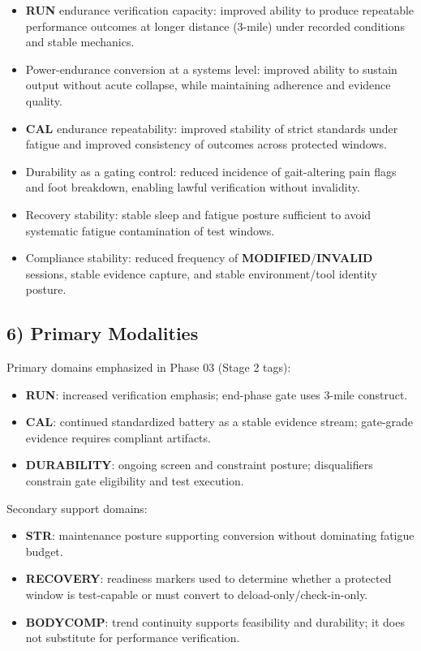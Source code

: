 \documentclass[10pt]{article}
\begin{document}
\begin{itemize}
\item \textbf{RUN} endurance verification capacity: improved ability to produce repeatable performance outcomes at longer distance (3-mile) under recorded conditions and stable mechanics.
\item Power-endurance conversion at a systems level: improved ability to sustain output without acute collapse, while maintaining adherence and evidence quality.
\item \textbf{CAL} endurance repeatability: improved stability of strict standards under fatigue and improved consistency of outcomes across protected windows.
\item Durability as a gating control: reduced incidence of gait-altering pain flags and foot breakdown, enabling lawful verification without invalidity.
\item Recovery stability: stable sleep and fatigue posture sufficient to avoid systematic fatigue contamination of test windows.
\item Compliance stability: reduced frequency of \textbf{MODIFIED}/\textbf{INVALID} sessions, stable evidence capture, and stable environment/tool identity posture.
\end{itemize}

\subsection*{6) Primary Modalities}

Primary domains emphasized in Phase 03 (Stage 2 tags):

\begin{itemize}
\item \textbf{RUN}: increased verification emphasis; end-phase gate uses 3-mile construct.
\item \textbf{CAL}: continued standardized battery as a stable evidence stream; gate-grade evidence requires compliant artifacts.
\item \textbf{DURABILITY}: ongoing screen and constraint posture; disqualifiers constrain gate eligibility and test execution.
\end{itemize}

Secondary support domains:

\begin{itemize}
\item \textbf{STR}: maintenance posture supporting conversion without dominating fatigue budget.
\item \textbf{RECOVERY}: readiness markers used to determine whether a protected window is test-capable or must convert to deload-only/check-in-only.
\item \textbf{BODYCOMP}: trend continuity supports feasibility and durability; it does not substitute for performance verification.
\end{itemize}
\end{document}
